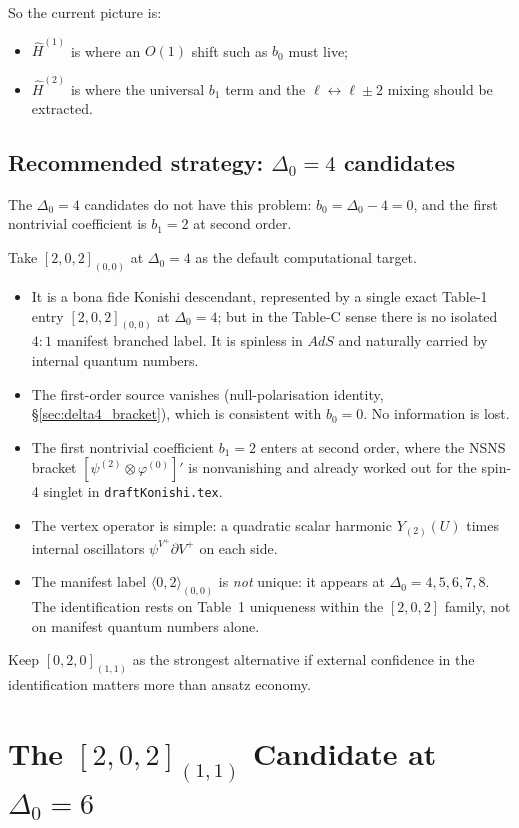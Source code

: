 \documentclass[12pt]{article}
\newcommand{\D}{\ensuremath{\Delta}}
\begin{document}
So the current picture is:
\begin{itemize}
\item $\widehat H^{(1)}$ is where an $O(1)$ shift such as $b_0$ must live;
\item $\widehat H^{(2)}$ is where the universal $b_1$ term and the $\ell\leftrightarrow \ell\pm2$
mixing should be extracted.
\end{itemize}

\subsection{Recommended strategy: \texorpdfstring{$\D_0=4$}{Delta0=4} candidates}

The $\D_0=4$ candidates do not have this problem: $b_0=\D_0-4=0$, and the first nontrivial
coefficient is $b_1=2$ at second order.

Take $[2,0,2]_{(0,0)}$ at $\D_0=4$ as the default computational target.
\begin{itemize}
\item It is a bona fide Konishi descendant, represented by a single exact Table-1 entry
$[2,0,2]_{(0,0)}$ at $\D_0=4$; but in the Table-C sense there is no isolated $4\!:\!1$
manifest branched label. It is spinless in $AdS$ and naturally carried by internal quantum numbers.
\item The first-order source vanishes (null-polarisation identity, \S\ref{sec:delta4_bracket}),
which is consistent with $b_0=0$. No information is lost.
\item The first nontrivial coefficient $b_1=2$ enters at second order, where the NSNS bracket
$[\psi^{(2)}\otimes\varphi^{(0)}]'$ is nonvanishing and already worked out for the spin-4
singlet in \texttt{draftKonishi.tex}.
\item The vertex operator is simple: a quadratic scalar harmonic $Y_{(2)}(U)$ times internal
oscillators $\psi^{V^+}\partial V^+$ on each side.
\item The manifest label $\langle 0,2\rangle_{(0,0)}$ is \emph{not} unique: it appears at
$\D_0=4,5,6,7,8$. The identification rests on Table~1 uniqueness within the $[2,0,2]$
family, not on manifest quantum numbers alone.
\end{itemize}

Keep $[0,2,0]_{(1,1)}$ as the strongest alternative if external confidence in the identification
matters more than ansatz economy.

\section{The \texorpdfstring{$[2,0,2]_{(1,1)}$}{[2,0,2](1,1)} Candidate at \texorpdfstring{$\D_0=6$}{Delta0=6}}
\label{sec:202_11}
\end{document}
